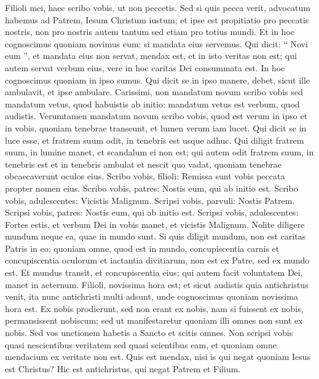 \begin{biblechapter}
\begin{biblechapter}
\verse Filioli mei, haec scribo vobis, ut non peccetis. Sed si quis pecca verit, advocatum habemus ad Patrem, Iesum Christum iustum; 
\verse et ipse est propitiatio pro peccatis nostris, non pro nostris autem tantum sed etiam pro totius mundi.
 \verse Et in hoc cognoscimus quoniam novimus eum: si mandata eius servemus. 
\verse Qui dicit: “ Novi eum ”, et mandata eius non servat, mendax est, et in isto veritas non est; 
\verse qui autem servat verbum eius, vere in hoc caritas Dei consummata est. In hoc cognoscimus quoniam in ipso sumus. 
\verse Qui dicit se in ipso manere, debet, sicut ille ambulavit, et ipse ambulare.
 \verse Carissimi, non mandatum novum scribo vobis sed mandatum vetus, quod habuistis ab initio: mandatum vetus est verbum, quod audistis. 
\verse Verumtamen mandatum novum scribo vobis, quod est verum in ipso et in vobis, quoniam tenebrae transeunt, et lumen verum iam lucet. 
\verse Qui dicit se in luce esse, et fratrem suum odit, in tenebris est usque adhuc. 
\verse Qui diligit fratrem suum, in lumine manet, et scandalum ei non est; 
\verse qui autem odit fratrem suum, in tenebris est et in tenebris ambulat et nescit quo vadat, quoniam tenebrae obcaecaverunt oculos eius.
 \verse Scribo vobis, filioli: Remissa sunt vobis peccata propter nomen eius. 
\verse Scribo vobis, patres: Nostis eum, qui ab initio est. Scribo vobis, adulescentes: Vicistis Malignum. 
\verse Scripsi vobis, parvuli: Nostis Patrem. Scripsi vobis, patres: Nostis eum, qui ab initio est. Scripsi vobis, adulescentes: Fortes estis, et verbum Dei in vobis manet, et vicistis Malignum.
 \verse Nolite diligere mundum neque ea, quae in mundo sunt. Si quis diligit mundum, non est caritas Patris in eo; 
\verse quoniam omne, quod est in mundo, concupiscentia carnis et concupiscentia oculorum et iactantia divitiarum, non est ex Patre, sed ex mundo est. 
\verse Et mundus transit, et concupiscentia eius; qui autem facit voluntatem Dei, manet in aeternum.
 \verse Filioli, novissima hora est; et sicut audistis quia antichristus venit, ita nunc antichristi multi adsunt, unde cognoscimus quoniam novissima hora est. 
 \verse Ex nobis prodierunt, sed non erant ex nobis, nam si fuissent ex nobis, permansissent nobiscum; sed ut manifestaretur quoniam illi omnes non sunt ex nobis. 
\verse Sed vos unctionem habetis a Sancto et scitis omnes. 
\verse Non scripsi vobis quasi nescientibus veritatem sed quasi scientibus eam, et quoniam omne mendacium ex veritate non est. 
\verse Quis est mendax, nisi is qui negat quoniam Iesus est Christus? Hic est antichristus, qui negat Patrem et Filium. 

\end{biblechapter}
\end{biblechapter}
